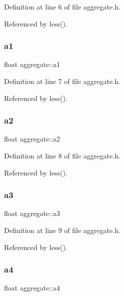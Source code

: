 Definition at line 6 of file aggregate.\+h.



Referenced by less().

\mbox{\label{structaggregate_a2c2033e1ef77b1a486c79284b5d65292}} 
\subsubsection{\texorpdfstring{a1}{a1}}
{\footnotesize\ttfamily float aggregate\+::a1}



Definition at line 7 of file aggregate.\+h.



Referenced by less().

\mbox{\label{structaggregate_a70e3edacc701c61f5c0c80f1b35f5605}} 
\subsubsection{\texorpdfstring{a2}{a2}}
{\footnotesize\ttfamily float aggregate\+::a2}



Definition at line 8 of file aggregate.\+h.



Referenced by less().

\mbox{\label{structaggregate_a1ec20aa5517958edc71428cfe8d5facb}} 
\subsubsection{\texorpdfstring{a3}{a3}}
{\footnotesize\ttfamily float aggregate\+::a3}



Definition at line 9 of file aggregate.\+h.



Referenced by less().

\mbox{\label{structaggregate_acebb4586be57a0b97091e23079ec6e52}} 
\subsubsection{\texorpdfstring{a4}{a4}}
{\footnotesize\ttfamily float aggregate\+::a4}



